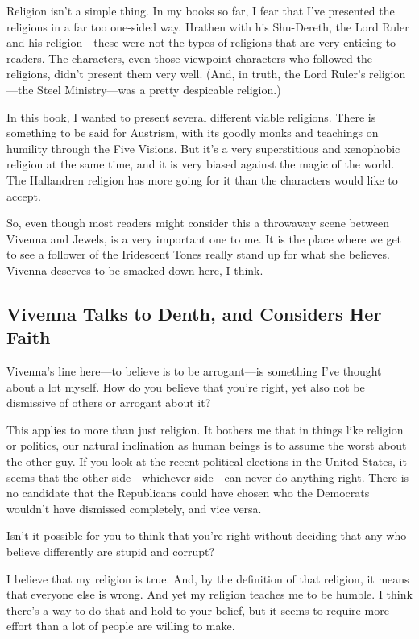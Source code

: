 Religion isn’t a simple thing. In my books so far, I fear that I’ve presented the religions in a far too one-sided way. Hrathen with his Shu-Dereth, the Lord Ruler and his religion—these were not the types of religions that are very enticing to readers. The characters, even those viewpoint characters who followed the religions, didn’t present them very well. (And, in truth, the Lord Ruler’s religion—the Steel Ministry—was a pretty despicable religion.)

In this book, I wanted to present several different viable religions. There is something to be said for Austrism, with its goodly monks and teachings on humility through the Five Visions. But it’s a very superstitious and xenophobic religion at the same time, and it is very biased against the magic of the world. The Hallandren religion has more going for it than the characters would like to accept.

So, even though most readers might consider this a throwaway scene between Vivenna and Jewels, is a very important one to me. It is the place where we get to see a follower of the Iridescent Tones really stand up for what she believes. Vivenna deserves to be smacked down here, I think.

\subsection*{Vivenna Talks to Denth, and Considers Her Faith}

Vivenna’s line here—to believe is to be arrogant—is something I’ve thought about a lot myself. How do you believe that you’re right, yet also not be dismissive of others or arrogant about it?

This applies to more than just religion. It bothers me that in things like religion or politics, our natural inclination as human beings is to assume the worst about the other guy. If you look at the recent political elections in the United States, it seems that the other side—whichever side—can never do anything right. There is no candidate that the Republicans could have chosen who the Democrats wouldn’t have dismissed completely, and vice versa.

Isn’t it possible for you to think that you’re right without deciding that any who believe differently are stupid and corrupt?

I believe that my religion is true. And, by the definition of that religion, it means that everyone else is wrong. And yet my religion teaches me to be humble. I think there’s a way to do that and hold to your belief, but it seems to require more effort than a lot of people are willing to make.



